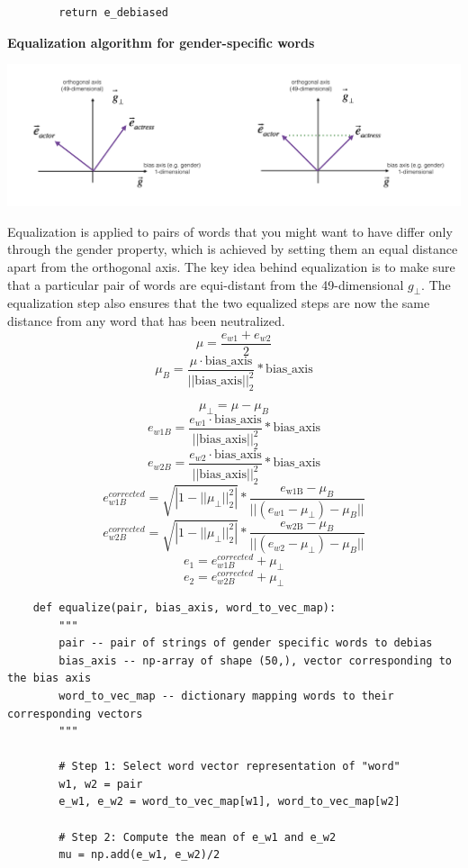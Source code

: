 \documentclass[11pt, a4paper]{article}
\begin{document}
\begin{spacing}{1.1}
\begin{lstlisting}
		return e_debiased \end{lstlisting} \vspace*{1mm}
	\textbf{Equalization algorithm for gender-specific words}
	\begin{center}
		\includegraphics[scale=.3]{equalize10}
	\end{center}
	Equalization is applied to pairs of words that you might want to have differ only through the gender property, which is achieved by setting them an equal distance apart from the orthogonal axis. The key idea behind equalization is to make sure that a particular pair of words are equi-distant from the 49-dimensional $g_\perp$. The equalization step also ensures that the two equalized steps are now the same distance from any word that has been neutralized.
	$$ \mu = \frac{e_{w1} + e_{w2}}{2}$$ 
	$$ \mu_{B} = \frac {\mu \cdot \text{bias\_axis}}{||\text{bias\_axis}||_2^2} *\text{bias\_axis}$$ \newpage

	$$\mu_{\perp} = \mu - \mu_{B} $$
	$$ e_{w1B} = \frac {e_{w1} \cdot \text{bias\_axis}}{||\text{bias\_axis}||_2^2} *\text{bias\_axis}$$ 
	$$ e_{w2B} = \frac {e_{w2} \cdot \text{bias\_axis}}{||\text{bias\_axis}||_2^2} *\text{bias\_axis}$$
	$$e_{w1B}^{corrected} = \sqrt{ |{1 - ||\mu_{\perp} ||^2_2} |} * \frac{e_{\text{w1B}} - \mu_B} {||(e_{w1} - \mu_{\perp}) - \mu_B||}$$	
	$$e_{w2B}^{corrected} = \sqrt{ |{1 - ||\mu_{\perp} ||^2_2} |} * \frac{e_{\text{w2B}} - \mu_B} {||(e_{w2} - \mu_{\perp}) - \mu_B||}$$
	$$e_1 = e_{w1B}^{corrected} + \mu_{\perp}$$
	$$e_2 = e_{w2B}^{corrected} + \mu_{\perp}$$
	\begin{lstlisting}
	def equalize(pair, bias_axis, word_to_vec_map):
		"""
		pair -- pair of strings of gender specific words to debias
		bias_axis -- np-array of shape (50,), vector corresponding to the bias axis
		word_to_vec_map -- dictionary mapping words to their corresponding vectors
		"""
		
		# Step 1: Select word vector representation of "word"
		w1, w2 = pair
		e_w1, e_w2 = word_to_vec_map[w1], word_to_vec_map[w2]
		
		# Step 2: Compute the mean of e_w1 and e_w2
		mu = np.add(e_w1, e_w2)/2
		

\end{lstlisting}
\end{spacing}
\end{document}
